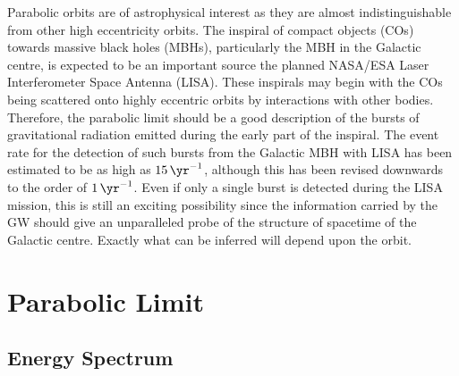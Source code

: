 \documentclass[aps,prd,reprint,showpacs,groupedaddress]{revtex4-1}
\begin{document}
Parabolic orbits are of astrophysical interest as they are almost indistinguishable from other high eccentricity orbits. The inspiral of compact objects (COs) towards massive black holes (MBHs), particularly the MBH in the Galactic centre, is expected to be an important source the planned NASA/ESA Laser Interferometer Space Antenna (LISA)\cite{Bender1998,Danzmann2003}. These inspirals may begin with the COs being scattered onto highly eccentric orbits by interactions with other bodies. Therefore, the parabolic limit should be a good description of the bursts of gravitational radiation emitted during the early part of the inspiral. The event rate for the detection of such bursts from the Galactic MBH with LISA has been estimated to be as high as $\SI{15}{\yr^{-1}}$\cite{Rubbo2006}, although this has been revised downwards to the order of $\SI{1}{\yr^{-1}}$\cite{Hopman2007}. Even if only a single burst is detected during the LISA mission, this is still an exciting possibility since the information carried by the GW should give an unparalleled probe of the structure of spacetime of the Galactic centre. Exactly what can be inferred will depend upon the orbit.

\section{Parabolic Limit\label{sec:limit}}

\subsection{Energy Spectrum}
\end{document}
